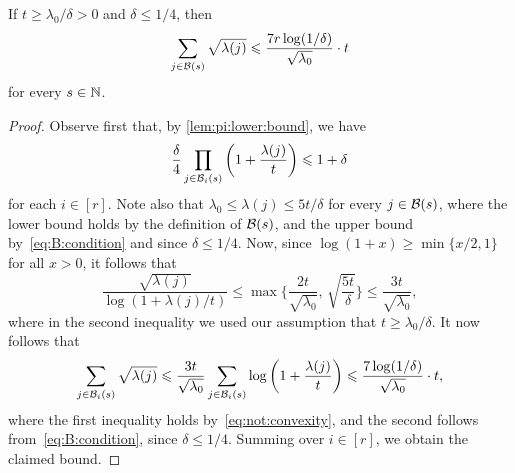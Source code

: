\begin{lemma}
  \label{lem:sum:of:lambdas} %
  If \(t \ge \lambda_0 / \delta > 0\) and \(\delta \le 1/4\), then
  \begin{equation*}
    \sum_{j \in \mathcal{B}(s)} \sqrt{\lambda(j)} \leqslant \frac{7r \log(1/\delta)}{\sqrt{\lambda_0}} \cdot t
  \end{equation*}
  for every \(s \in \mathbb{N}\). 
\end{lemma}
%
\begin{proof}
  Observe first that, by \autoref{lem:pi:lower:bound}, we have 
  \begin{equation}\label{eq:B:condition}
    \frac{\delta}{4} \prod_{j \in \mathcal{B}_i(s)} \bigg( 1 + \frac{\lambda(j)}{t} \bigg) \leqslant 1 + \delta
  \end{equation}
  for each \(i \in [r]\). Note also that \(\lambda_0 \le \lambda(j) \le 5t/\delta\) for every \(j \in \mathcal{B}(s)\), where the lower bound holds by the definition of \(\mathcal{B}(s)\), and the upper bound by~\eqref{eq:B:condition} and since \(\delta \le 1/4\). Now, since \(\log(1+x) \ge \min\{ x/2,1\}\) for all \(x > 0\), it follows that
  \begin{equation}\label{eq:not:convexity}
    \frac{ \sqrt{\lambda(j)} }{\log(1 + \lambda(j)/t) } \le \max\bigg\{ \frac{ 2t }{ \sqrt{\lambda_0} }, \, \sqrt{ \frac{5t}{\delta}} \bigg\} \le \frac{ 3t }{ \sqrt{\lambda_0} },
  \end{equation}
  where in the second inequality we used our assumption that \(t \ge \lambda_0 / \delta\). It now follows that
  \begin{equation*}
    \sum_{j \in \mathcal{B}_i(s)} \sqrt{\lambda(j)} \leqslant \frac{ 3t }{ \sqrt{\lambda_0} } \sum_{j \in \mathcal{B}_i(s)} \log \bigg( 1 + \frac{\lambda(j)}{t} \bigg) \leqslant \frac{7 \log(1/\delta)}{\sqrt{\lambda_0}} \cdot t,
  \end{equation*}
  where the first inequality holds by~\eqref{eq:not:convexity}, and the second follows from~\eqref{eq:B:condition}, since \(\delta \le 1/4\). Summing over \(i \in [r]\), we obtain the claimed bound. 
\end{proof}


